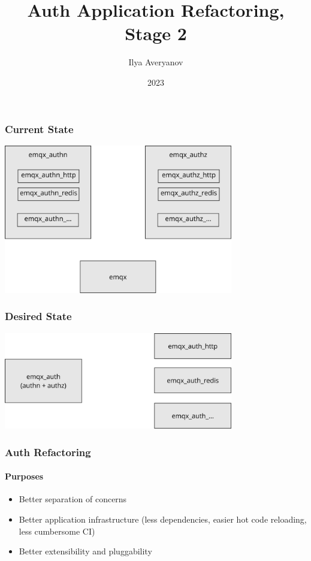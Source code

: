 \documentclass{beamer}
\title{Auth Application Refactoring, Stage 2}
\author{Ilya Averyanov}
\institute{EMQX}
\date{2023}
\begin{document}
\frame{\titlepage}

\begin{frame}
    \frametitle{Current State}
    \begin{center}
        \includegraphics[width=10cm, keepaspectratio]{images/current.png}
    \end{center}
\end{frame}


\begin{frame}
    \frametitle{Desired State}
    \begin{center}
        \includegraphics[width=10cm, keepaspectratio]{images/desired.png}
    \end{center}
\end{frame}

\begin{frame}
    \frametitle{Auth Refactoring}
    \framesubtitle{Purposes}

    \begin{center}
        \begin{itemize}
            \item Better separation of concerns
            \item Better application infrastructure (less dependencies, easier hot code reloading, less cumbersome CI)
            \item Better extensibility and pluggability
        \end{itemize}
    \end{center}
\end{frame}
\end{document}
